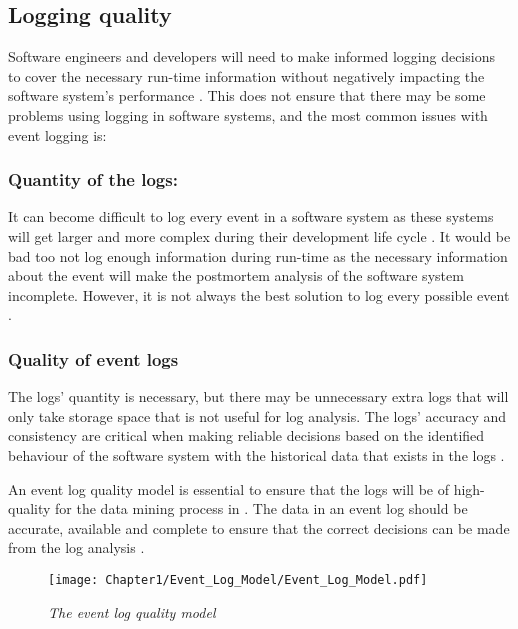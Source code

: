 \subsection{Logging quality}\label{sec:CH1_LoggingQuality}

Software engineers and developers will need to make informed logging decisions to cover the necessary run-time information without negatively impacting the software system's performance \cite{Zhu2015,Zhu2019,Kherbouche2017}. This does not ensure that there may be some problems using logging in software systems, and the most common issues with event logging is:

\subsubsection{Quantity of the logs:} 
It can become difficult to log every event in a software system as these systems will get larger and more complex during their development life cycle \cite{Stojanov2017}. It would be bad too not log enough information during run-time as the necessary information about the event will make the postmortem analysis of the software system incomplete. However, it is not always the best solution to log every possible event \cite{Zhu2015, Jans2012}.

\subsubsection{Quality of event logs} 
The logs' quantity is necessary, but there may be unnecessary extra logs that will only take storage space that is not useful for log analysis. The logs' accuracy and consistency are critical when making reliable decisions based on the identified behaviour of the software system with the historical data that exists in the logs \cite{Stojanov2017,Kherbouche2017}.\par An event log quality model is essential to ensure that the logs will be of high-quality for the data mining process in . The data in an event log should be accurate, available and complete to ensure that the correct decisions can be made from the log analysis \cite{Kherbouche2017, VanDerAalst2011}.

\begin{figure}[!htb] %
	\centering %
	\texttt{[image: Chapter1/Event\_Log\_Model/Event\_Log\_Model.pdf]}
	\caption[The event log quality model]
	{\textit{The event log quality model \cite{Kherbouche2017}}} \label{fig:EventQModel}
\end{figure}

